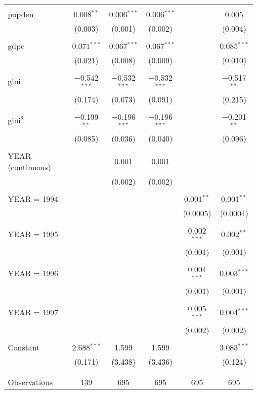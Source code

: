 \documentclass[12pt,a4paper]{article}\usepackage[]{graphicx}\usepackage[]{color}
\begin{document}
\begin{table}[!htbp]
\begin{tabular}{@{\extracolsep{5pt}}lccccc}
  & & & & & \\ 
 popden & 0.008$^{**}$ & 0.006$^{***}$ & 0.006$^{***}$ &  & 0.005 \\ 
  & (0.003) & (0.001) & (0.002) &  & (0.004) \\ 
  & & & & & \\ 
 gdpc & 0.071$^{***}$ & 0.067$^{***}$ & 0.067$^{***}$ &  & 0.085$^{***}$ \\ 
  & (0.021) & (0.008) & (0.009) &  & (0.010) \\ 
  & & & & & \\ 
 gini & $-$0.542$^{***}$ & $-$0.532$^{***}$ & $-$0.532$^{***}$ &  & $-$0.517$^{**}$ \\ 
  & (0.174) & (0.073) & (0.091) &  & (0.215) \\ 
  & & & & & \\ 
 gini$^2$ & $-$0.199$^{**}$ & $-$0.196$^{***}$ & $-$0.196$^{***}$ &  & $-$0.201$^{**}$ \\ 
  & (0.085) & (0.036) & (0.040) &  & (0.096) \\ 
  & & & & & \\ 
 YEAR (continuous) &  & 0.001 & 0.001 &  &  \\ 
  &  & (0.002) & (0.002) &  &  \\ 
  & & & & & \\ 
 YEAR = 1994 &  &  &  & 0.001$^{**}$ & 0.001$^{**}$ \\ 
  &  &  &  & (0.0005) & (0.0004) \\ 
  & & & & & \\ 
 YEAR = 1995 &  &  &  & 0.002$^{***}$ & 0.002$^{**}$ \\ 
  &  &  &  & (0.001) & (0.001) \\ 
  & & & & & \\ 
 YEAR = 1996 &  &  &  & 0.004$^{***}$ & 0.003$^{***}$ \\ 
  &  &  &  & (0.001) & (0.001) \\ 
  & & & & & \\ 
 YEAR = 1997 &  &  &  & 0.005$^{***}$ & 0.004$^{***}$ \\ 
  &  &  &  & (0.002) & (0.002) \\ 
  & & & & & \\ 
 Constant & 2.688$^{***}$ & 1.599 & 1.599 &  & 3.083$^{***}$ \\ 
  & (0.171) & (3.438) & (3.436) &  & (0.124) \\ 
  & & & & & \\ 
\hline \\[-1.8ex] 
Observations & 139 & 695 & 695 & 695 & 695 \\ 

\end{tabular}
\end{table}
\end{document}

